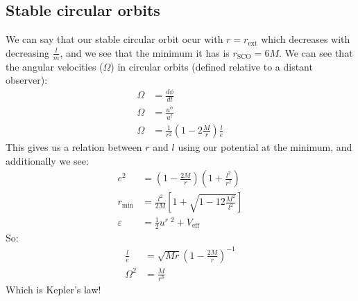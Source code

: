 \subsection{Stable circular orbits}
We can say that our stable circular orbit ocur with $r=r_\text{ext}$ which decreases with decreasing $\frac{l}{m}$, and we see that the minimum it has is $r_\text{SCO} = 6M$.
We can see that the angular velocities ($\Omega$) in circular orbits (defined relative to a distant observer):
\begin{align*}
	\Omega &= \frac{d\phi}{dt} \\
	\Omega &= \frac{u^\phi}{u^t} \\
	\Omega &= \frac{1}{r^2} \left(1 - 2\frac{M}{r}\right) \frac{l}{e}
\end{align*}
This gives us a relation between $r$ and $l$ using our potential at the minimum, and additionally we see:
\begin{align*}
	e^2 &= \left(1-\frac{2M}{r}\right)\left(1 + \frac{l^2}{r^2}\right) \\
	r_\text{min} &= \frac{l^2}{2M} \left[ 1 + \sqrt{1 - 12\frac{M^2}{l^2}}\right] \\
	\varepsilon &= \frac{1}{2} u^r\ ^2 + V_\text{eff}
\end{align*}
So:
\begin{align*}
	\frac{l}{e} &= \sqrt{Mr} \left(1 - \frac{2M}{r}\right)^{-1} \\
	\Omega^2 &= \frac{M}{r^3}
\end{align*}
Which is Kepler's law!

